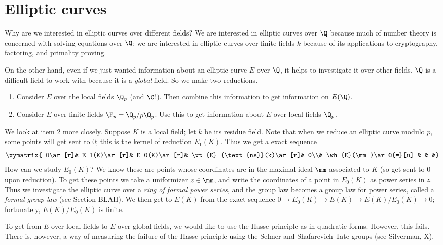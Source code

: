 \chapter{Elliptic curves}
Why are we interested in elliptic curves over different fields? We are interested in elliptic curves over $\Q$ because much of number theory is concerned with solving equations over $\Q$; we are interested in elliptic curves over finite fields $k$ because of its applications to cryptography, factoring, and primality proving.

On the other hand, even if we just wanted information about an elliptic curve $E$ over $\Q$, it helps to investigate it over other fields. $\Q$ is a difficult field to work with because it is a {\it global} field. So we make two reductions.
\begin{enumerate}
\item Consider $E$ over the local fields $\Q_p$ (and $\C$!). Then combine this information to get information on $E(\Q)$.
\item Consider $E$ over finite fields $\F_p=\Q_p/p\Q_p$. Use this to get information about $E$ over local fields $\Q_p$.
\end{enumerate}
We look at item 2 more closely. Suppose $K$ is a local field; let $k$ be its residue field. 
Note that when we reduce an elliptic curve modulo $p$, some points will get sent to 0; this is the kernel of reduction $E_1(K)$. Thus we get a exact sequence
\[
\xymatrix{
0\ar[r]& E_1(K)\ar[r]&  E_0(K)\ar[r]&  \wt{E}_{\text{ns}}(k)\ar[r]&  0\\%
& \wh{E}(\mm)\ar@{=}[u] &  & &}
\]
How can we study $E_0(K)$? We know these are points whose coordinates are in the maximal ideal $\mm$ associated to $K$ (so get sent to 0 upon reduction). 
To get these points we take a uniformizer $z\in \mm$, and write the coordinates of a point in $E_0(K)$ as power series in $z$. Thus we investigate the elliptic curve over a {\it ring of formal power series}, and the group law becomes a group law for power series, called a {\it formal group law} (see Section BLAH). We then get to $E(K)$ from the exact sequence $0\to E_0(K)\to E(K)\to E(K)/E_0(K)\to 0$; fortunately, $E(K)/E_0(K)$ is finite.

To get from $E$ over local fields to $E$ over global fields, we would like to use the Hasse principle as in quadratic forms. However, this fails. There is, however, a way of measuring the failure of the Hasse principle using the Selmer and Shafarevich-Tate groups (see Silverman, X).

